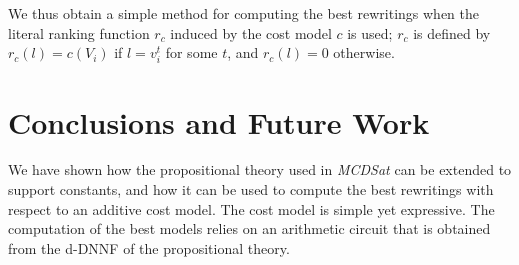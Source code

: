 \documentclass{llncs}
\begin{document}
We thus obtain a simple method for computing the best
rewritings when the literal ranking function $r_c$ induced
by the cost model $c$ is used; $r_c$ is defined by
$r_c(l)=c(V_i)$ if $l=v^t_i$ for some $t$, and $r_c(l)=0$
otherwise.


\section{Conclusions and Future Work}

We have shown how the propositional theory used in {\it MCDSat} can
be extended to support constants, and how it can be used to 
compute the best rewritings with respect to an additive
cost model. The cost model is simple yet expressive.
The computation of the best models relies on an arithmetic
circuit that is obtained from the d-DNNF of the propositional
theory.



\end{document}

